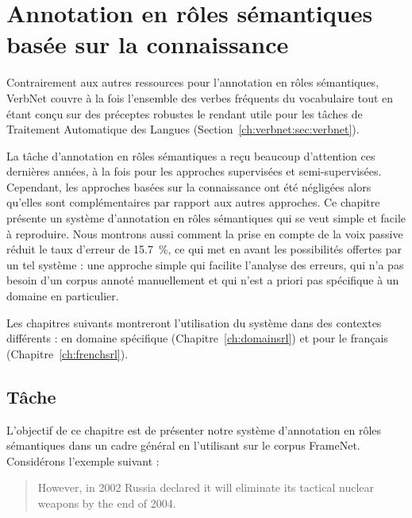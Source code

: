 \chapter{Annotation en rôles sémantiques basée sur la connaissance}
\label{ch:srl}



Contrairement aux autres ressources pour l'annotation en rôles sémantiques,
VerbNet couvre à la fois l'ensemble des verbes fréquents du vocabulaire tout en
étant conçu sur des préceptes robustes le rendant utile pour les tâches de
Traitement Automatique des Langues (Section~\ref{ch:verbnet:sec:verbnet}).

La tâche d'annotation en rôles sémantiques a reçu beaucoup d'attention ces
dernières années, à la fois pour les approches supervisées et semi-supervisées.
Cependant, les approches basées sur la connaissance ont été négligées alors
qu'elles sont complémentaires par rapport aux autres approches. Ce chapitre
présente un système d'annotation en rôles sémantiques qui se veut simple et
facile à reproduire. Nous montrons aussi comment la prise en compte de la voix
passive réduit le taux d'erreur de 15.7~\%, ce qui met en avant les
possibilités offertes par un tel système : une approche simple qui facilite
l'analyse des erreurs, qui n'a pas besoin d'un corpus annoté manuellement et
qui n'est a priori pas spécifique à un domaine en particulier.

 Les chapitres suivants montreront l'utilisation du système dans des contextes
différents : en domaine spécifique (Chapitre~\ref{ch:domainsrl}) et pour le
français (Chapitre~\ref{ch:frenchsrl}).


\section{Tâche}

L'objectif de ce chapitre est de présenter notre système d'annotation en rôles
sémantiques dans un cadre général en l'utilisant sur le corpus FrameNet.
Considérons l'exemple suivant :

\begin{quote}
However, in 2002 Russia declared it will eliminate its tactical nuclear weapons by the end of 2004.
\end{quote}

